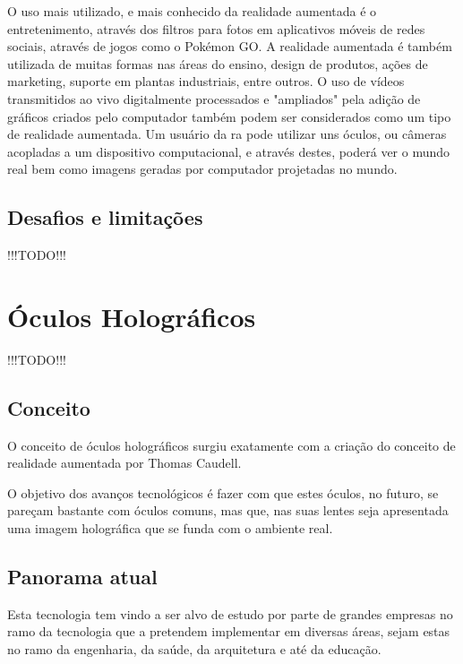 \documentclass{report}
\begin{document}
O uso mais utilizado, e mais conhecido da realidade aumentada é o entretenimento, através dos filtros para fotos em aplicativos móveis de redes sociais, através de jogos como o Pokémon GO. A realidade aumentada é também utilizada de muitas formas nas áreas do ensino, design de produtos, ações de marketing, suporte em plantas industriais, entre outros. O uso de vídeos transmitidos ao vivo digitalmente processados e "ampliados" pela adição de gráficos criados pelo computador também podem ser considerados como um tipo de realidade aumentada. Um usuário da \ac{ra} pode utilizar uns óculos, ou câmeras acopladas a um dispositivo computacional, e através destes, poderá ver o mundo real bem como imagens geradas por computador projetadas no mundo.


\section{Desafios e limitações}
!!!TODO!!!

\chapter{Óculos Holográficos}
\label{chap.oculos-holograficos}
!!!TODO!!!

\section{Conceito}
O conceito de óculos holográficos surgiu exatamente com a criação do conceito de realidade aumentada por Thomas Caudell.

O objetivo dos avanços tecnológicos é fazer com que estes óculos, no futuro, se pareçam bastante com óculos comuns, mas que, nas suas lentes seja apresentada uma
imagem holográfica que se funda com o ambiente real.

\section{Panorama atual}
Esta tecnologia tem vindo a ser alvo de estudo por parte de grandes empresas no ramo da tecnologia que a pretendem implementar em diversas áreas, sejam estas no ramo da engenharia, da saúde, da arquitetura e até da educação.
\end{document}

